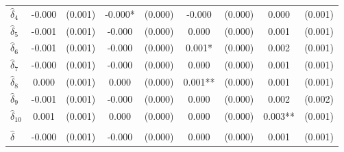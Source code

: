 {\begin{tabular}{l*{4}{cc}}
$\hat{\delta}_4$&      -0.000   &     (0.001)&      -0.000*  &     (0.000)&      -0.000   &     (0.000)&       0.000   &     (0.001)\\
$\hat{\delta}_5$&      -0.001   &     (0.001)&      -0.000   &     (0.000)&       0.000   &     (0.000)&       0.001   &     (0.001)\\
$\hat{\delta}_6$&      -0.001   &     (0.001)&      -0.000   &     (0.000)&       0.001*  &     (0.000)&       0.002   &     (0.001)\\
$\hat{\delta}_7$&      -0.000   &     (0.001)&      -0.000   &     (0.000)&       0.000   &     (0.000)&       0.001   &     (0.001)\\
$\hat{\delta}_8$&       0.000   &     (0.001)&       0.000   &     (0.000)&       0.001** &     (0.000)&       0.001   &     (0.001)\\
$\hat{\delta}_9$&      -0.001   &     (0.001)&      -0.000   &     (0.000)&       0.000   &     (0.000)&       0.002   &     (0.002)\\
$\hat{\delta}_{10}$&       0.001   &     (0.001)&       0.000   &     (0.000)&       0.000   &     (0.000)&       0.003** &     (0.001)\\
\addlinespace&               &            &               &            &               &            &               &            \\
$\hat{\delta}$&      -0.000   &     (0.001)&      -0.000   &     (0.000)&       0.000   &     (0.000)&       0.001   &     (0.001)\\
\bottomrule
\end{tabular}
}
